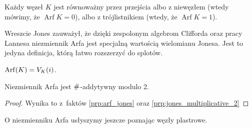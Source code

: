 \begin{definition}[Kauffman, 1983]
    Każdy węzeł $K$ jest równoważny przez przejścia albo z niewęzłem (wtedy mówimy, że $\operatorname{Arf} K = 0$), albo z trójlistnikiem (wtedy, że $\operatorname{Arf} K = 1$).
\end{definition}

Wreszcie Jones \cite[tw. 19]{jones1985} zauważył, że dzięki zespolonym algebrom Clifforda oraz pracy Lannesa \cite{lannes1985} niezmiennik Arfa jest specjalną wartością wielomianu Jonesa.
%
Jest to jedyna definicja, którą łatwo rozszerzyć do splotów.

\begin{proposition}[Jones, 1985]
\label{prp:arf_jones}%
    $\operatorname{Arf}(K) = V_K(i)$.
\end{proposition}

\begin{corollary}
    \label{cor:arf_adds}%
    Niezmiennik Arfa jest $\mathbin{\#}$-addytywny modulo 2.
\end{corollary}

\begin{proof}
    Wynika to z~faktów \ref{prp:arf_jones} oraz \ref{prp:jones_multiplicative_2} %
\end{proof}

O niezmienniku Arfa usłyszymy jeszcze poznając węzły plastrowe.



